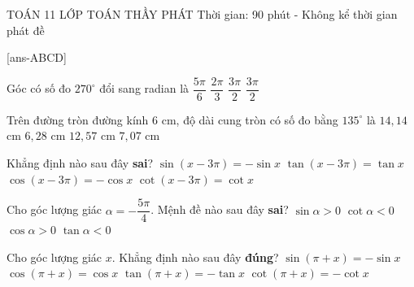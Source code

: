 \begin{name}
	{\tenchude}
	{TOÁN 11}
	{LỚP TOÁN THẦY PHÁT}
	{Thời gian: 90 phút - Không kể thời gian phát đề}
\end{name}

\caulc

[ans-ABCD]


\begin{ex}%
	Góc có số đo $270^\circ$ đổi sang radian là
	\choice
	{$\dfrac{5\pi}{6}$}
	{$\dfrac{2\pi}{3}$}
	{$\dfrac{3\pi}{2}$}
	{\True $\dfrac{3\pi}{2}$}
\end{ex}

\begin{ex}%
	Trên đường tròn đường kính $6$ cm, độ dài cung tròn có số đo bằng $135^\circ$ là
	\choice
	{$14{,}14$ cm}
	{$6{,}28$ cm}
	{$12{,}57$ cm}
	{\True $7{,}07$ cm}
\end{ex}

\begin{ex}%
	Khẳng định nào sau đây \textbf{sai}?
	\choice
	{$\sin(x-3\pi)=-\sin x$}
	{\True $\tan(x-3\pi)=\tan x$}
	{$\cos(x-3\pi)=-\cos x$}
	{$\cot(x-3\pi)=\cot x$}
\end{ex}

\begin{ex}%
	Cho góc lượng giác $\alpha=-\dfrac{5\pi}{4}$. Mệnh đề nào sau đây \textbf{sai}?
	\choice
	{$\sin\alpha>0$}
	{$\cot\alpha<0$}
	{\True $\cos\alpha>0$}
	{$\tan\alpha<0$}
\end{ex}

\begin{ex}%
	Cho góc lượng giác $x$. Khẳng định nào sau đây \textbf{đúng}?
	\choice
	{\True $\sin(\pi+x)=-\sin x$}
	{$\cos(\pi+x)=\cos x$}
	{$\tan(\pi+x)=-\tan x$}
	{$\cot(\pi+x)=-\cot x$}
\end{ex}

